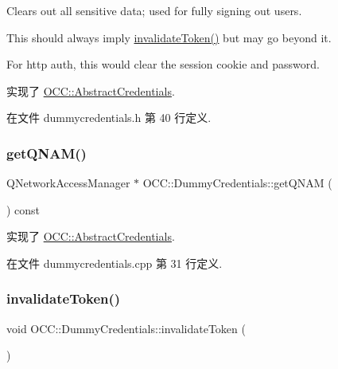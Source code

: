 Clears out all sensitive data; used for fully signing out users.

This should always imply \hyperlink{class_o_c_c_1_1_dummy_credentials_a57c8037130e3c0b1729d7d89390a599b}{invalidate\+Token()} but may go beyond it.

For http auth, this would clear the session cookie and password. 

实现了 \hyperlink{class_o_c_c_1_1_abstract_credentials_af8f5afe21813bd54607713342fef8448}{O\+C\+C\+::\+Abstract\+Credentials}.



在文件 dummycredentials.\+h 第 40 行定义.

\mbox{\label{class_o_c_c_1_1_dummy_credentials_af8987175306059ae7beaff9e38b5c68d}} 
\subsubsection{\texorpdfstring{get\+Q\+N\+A\+M()}{getQNAM()}}
{\footnotesize\ttfamily Q\+Network\+Access\+Manager $\ast$ O\+C\+C\+::\+Dummy\+Credentials\+::get\+Q\+N\+AM (\begin{DoxyParamCaption}{ }\end{DoxyParamCaption}) const\hspace{0.3cm}{\ttfamily [virtual]}}



实现了 \hyperlink{class_o_c_c_1_1_abstract_credentials_ae5b9fd23e37129efede9b4d430ac5766}{O\+C\+C\+::\+Abstract\+Credentials}.



在文件 dummycredentials.\+cpp 第 31 行定义.

\mbox{\label{class_o_c_c_1_1_dummy_credentials_a57c8037130e3c0b1729d7d89390a599b}} 
\subsubsection{\texorpdfstring{invalidate\+Token()}{invalidateToken()}}
{\footnotesize\ttfamily void O\+C\+C\+::\+Dummy\+Credentials\+::invalidate\+Token (\begin{DoxyParamCaption}{ }\end{DoxyParamCaption})\hspace{0.3cm}{\ttfamily [virtual]}}

